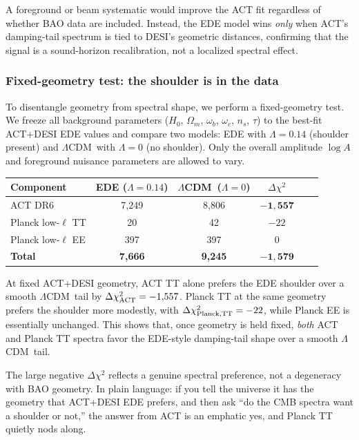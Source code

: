 \documentclass[twocolumn,showpacs,preprintnumbers,amsmath,amssymb,prd]{revtex4-2}
\newcommand{\lcdm}{$\Lambda$CDM}
\begin{document}
A foreground or beam systematic would improve the ACT fit regardless of whether 
BAO data are included. Instead, the EDE model wins \emph{only} when ACT's 
damping-tail spectrum is tied to DESI's geometric distances, confirming that 
the signal is a sound-horizon recalibration, not a localized spectral effect.

\subsubsection{Fixed-geometry test: the shoulder is in the data}
\label{sec:fixed_geometry}

To disentangle geometry from spectral shape, we perform a fixed-geometry test. 
We freeze all background parameters ($H_0$, $\Omega_m$, $\omega_b$, $\omega_c$, 
$n_s$, $\tau$) to the best-fit ACT+DESI EDE values and compare two models: 
EDE with $\Lambda = 0.14$ (shoulder present) and \lcdm\ with $\Lambda = 0$ 
(no shoulder). Only the overall amplitude $\log A$ and foreground nuisance 
parameters are allowed to vary.

\begin{center}
\begin{tabular}{lccccc}
\toprule
Component & EDE ($\Lambda = 0.14$) & \lcdm\ ($\Lambda = 0$) & $\Delta\chi^2$ \\
\midrule
ACT DR6 & 7{,}249 & 8{,}806 & $\mathbf{-1{,}557}$ \\
Planck low-$\ell$ TT & 20 & 42 & $-22$ \\
Planck low-$\ell$ EE & 397 & 397 & $0$ \\
\midrule
\textbf{Total} & \textbf{7{,}666} & \textbf{9{,}245} & $\mathbf{-1{,}579}$ \\
\bottomrule
\end{tabular}
\end{center}

At fixed ACT+DESI geometry, ACT TT alone prefers the EDE shoulder over a 
smooth \lcdm\ tail by $\Delta\chi^2_{\rm ACT} = -1{,}557$. Planck TT at the 
same geometry prefers the shoulder more modestly, with $\Delta\chi^2_{\rm Planck,TT} = -22$, 
while Planck EE is essentially unchanged. This shows that, once geometry is 
held fixed, \emph{both} ACT and Planck TT spectra favor the EDE-style 
damping-tail shape over a smooth \lcdm\ tail.

The large negative $\Delta\chi^2$ reflects a genuine spectral preference, 
not a degeneracy with BAO geometry. In plain language: if you tell the 
universe it has the geometry that ACT+DESI EDE prefers, and then ask 
``do the CMB spectra want a shoulder or not,'' the answer from ACT is 
an emphatic yes, and Planck TT quietly nods along.
\end{document}
